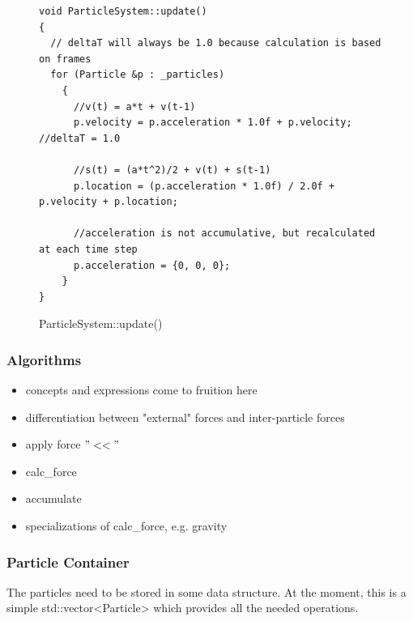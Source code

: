 \documentclass[runningheads,a4paper]{llncs}
\begin{document}
\begin{figure}[tb]
\begin{lstlisting}
void ParticleSystem::update()                                                              
{                                                                                          
  // deltaT will always be 1.0 because calculation is based on frames                               
  for (Particle &p : _particles)                                                           
    {                                                                                      
      //v(t) = a*t + v(t-1)                                                            
      p.velocity = p.acceleration * 1.0f + p.velocity; //deltaT = 1.0                                  
                                                                                           
      //s(t) = (a*t^2)/2 + v(t) + s(t-1)                                               
      p.location = (p.acceleration * 1.0f) / 2.0f + p.velocity + p.location;
                                       	
      //acceleration is not accumulative, but recalculated at each time step          
      p.acceleration = {0, 0, 0};
    }                                                                                      
}                                                            
\end{lstlisting}
 \caption{ParticleSystem::update()}
 \label{fig:update}
\end{figure}

\subsubsection{Algorithms}
\begin{itemize}
\item concepts and expressions come to fruition here
\item differentiation between "external" forces and inter-particle forces
\item apply force $"<<"$
\item calc\_force
\item accumulate
\item specializations of calc\_force, e.g. gravity
\end{itemize}

\subsubsection{Particle Container}
The particles need to be stored in some data structure. At the moment, this is a simple std::vector<Particle> which provides all the needed operations.
\end{document}
